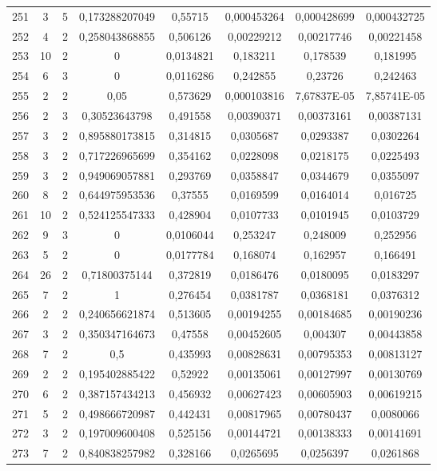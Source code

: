 \begin{longtable}{|c|c|c|c|c|c|c|c|}
251 & 3 & 5 & 0,173288207049 & 0,55715 & 0,000453264 & 0,000428699 & 0,000432725  \\
252 & 4 & 2 & 0,258043868855 & 0,506126 & 0,00229212 & 0,00217746 & 0,00221458  \\
253 & 10 & 2 & 0 & 0,0134821 & 0,183211 & 0,178539 & 0,181995  \\
254 & 6 & 3 & 0 & 0,0116286 & 0,242855 & 0,23726 & 0,242463  \\
255 & 2 & 2 & 0,05 & 0,573629 & 0,000103816 & 7,67837E-05 & 7,85741E-05  \\
256 & 2 & 3 & 0,30523643798 & 0,491558 & 0,00390371 & 0,00373161 & 0,00387131  \\
257 & 3 & 2 & 0,895880173815 & 0,314815 & 0,0305687 & 0,0293387 & 0,0302264  \\
258 & 3 & 2 & 0,717226965699 & 0,354162 & 0,0228098 & 0,0218175 & 0,0225493  \\
259 & 3 & 2 & 0,949069057881 & 0,293769 & 0,0358847 & 0,0344679 & 0,0355097  \\
260 & 8 & 2 & 0,644975953536 & 0,37555 & 0,0169599 & 0,0164014 & 0,016725  \\
261 & 10 & 2 & 0,524125547333 & 0,428904 & 0,0107733 & 0,0101945 & 0,0103729  \\
262 & 9 & 3 & 0 & 0,0106044 & 0,253247 & 0,248009 & 0,252956  \\
263 & 5 & 2 & 0 & 0,0177784 & 0,168074 & 0,162957 & 0,166491  \\
264 & 26 & 2 & 0,71800375144 & 0,372819 & 0,0186476 & 0,0180095 & 0,0183297  \\
265 & 7 & 2 & 1 & 0,276454 & 0,0381787 & 0,0368181 & 0,0376312  \\
266 & 2 & 2 & 0,240656621874 & 0,513605 & 0,00194255 & 0,00184685 & 0,00190236  \\
267 & 3 & 2 & 0,350347164673 & 0,47558 & 0,00452605 & 0,004307 & 0,00443858  \\
268 & 7 & 2 & 0,5 & 0,435993 & 0,00828631 & 0,00795353 & 0,00813127  \\
269 & 2 & 2 & 0,195402885422 & 0,52922 & 0,00135061 & 0,00127997 & 0,00130769  \\
270 & 6 & 2 & 0,387157434213 & 0,456932 & 0,00627423 & 0,00605903 & 0,00619215  \\
271 & 5 & 2 & 0,498666720987 & 0,442431 & 0,00817965 & 0,00780437 & 0,0080066  \\
272 & 3 & 2 & 0,197009600408 & 0,525156 & 0,00144721 & 0,00138333 & 0,00141691  \\
273 & 7 & 2 & 0,840838257982 & 0,328166 & 0,0265695 & 0,0256397 & 0,0261868  \\

\end{longtable}
